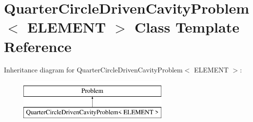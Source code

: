 \hypertarget{classQuarterCircleDrivenCavityProblem}{}\section{Quarter\+Circle\+Driven\+Cavity\+Problem$<$ E\+L\+E\+M\+E\+NT $>$ Class Template Reference}
\label{classQuarterCircleDrivenCavityProblem}
Inheritance diagram for Quarter\+Circle\+Driven\+Cavity\+Problem$<$ E\+L\+E\+M\+E\+NT $>$\+:\begin{figure}[H]
\begin{center}
\leavevmode
\includegraphics[height=2.000000cm]{classQuarterCircleDrivenCavityProblem}
\end{center}
\end{figure}
